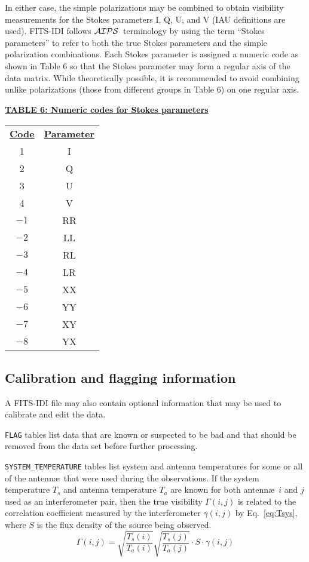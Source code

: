 \documentclass[twoside]{article}
\newcommand{\Hi}[1]{\textcolor{hicol}{#1}}
\newcommand{\AIPS}{{$\cal AIPS\/$}}
\begin{document}
In either case, the simple polarizations may be combined to obtain
visibility measurements for the Stokes parameters I, Q, U, and V (IAU
definitions are used).  FITS-IDI follows \AIPS\ terminology by using
the term ``Stokes parameters'' to refer to both the true Stokes
parameters and the simple polarization combinations.  Each Stokes
parameter is assigned a numeric code as shown in Table 6 so that the
Stokes parameter may form a regular axis of the data matrix.
\Hi{While theoretically possible, it is recommended to avoid combining
unlike polarizations (those from different groups in Table 6) on one
regular axis.}

\begin{center}
\underline{\bf{TABLE 6: Numeric codes for Stokes parameters}}\\
\begin{tabular}{cc}
\noalign{\vspace{2pt}}
\underline{{\bf Code\vphantom{y}}} &
    \underline{\bf{Parameter\vphantom{y}}} \\
\noalign{\vspace{2pt}}
  1  & I \\
  2  & Q \\
  3  & U \\
  4  & V \\
\hline
 $-1$  & RR \\
 $-2$  & LL \\
 $-3$  & RL \\
 $-4$  & LR \\
\hline
 $-5$  & XX \\
 $-6$  & YY \\
 $-7$  & XY \\
 $-8$  & YX
\end{tabular}
\end{center}

\subsection{Calibration and flagging information}

A FITS-IDI file may also contain optional information that may be used
to calibrate and edit the data.

{\tt FLAG} tables list data that are known or suspected to be bad and
that should be removed from the data set before further processing.

{\tt SYSTEM\_TEMPERATURE} tables list system and antenna temperatures
for some or all of the antenn\ae\ that were used during the
observations.  If the system temperature $T_s$ and antenna temperature
$T_a$ are known for both antenn\ae\ $i$ and $j$ used as an
interferometer pair, then the true visibility $\Gamma(i,j)$ is related
to the \Hi{correlation coefficient} measured by the interferometer
$\gamma(i,j)$ by Eq.~\ref{eq:Tsys}, where $S$ is the flux density of
the source being observed.
\begin{equation}
\Gamma(i,j) = \sqrt{\frac{T_s(i)}{T_a(i)}}
          \sqrt{\frac{T_s(j)}{T_a(j)}} \cdot S \cdot \gamma(i,j)
           \label{eq:Tsys}
\end{equation}
\end{document}
